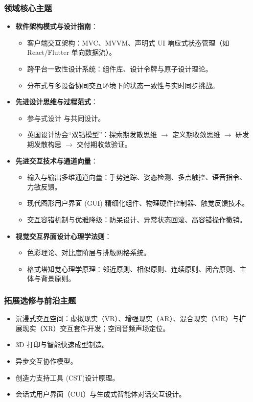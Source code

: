 \subsubsection{领域核心主题}
\begin{itemize}
    \item \textbf{软件架构模式与设计指南}：
    \begin{itemize}
        \item 客户端交互架构：MVC、MVVM、声明式 UI 响应式状态管理（如 React/Flutter 单向数据流）。
        \item 跨平台一致性设计系统：组件库、设计令牌与原子设计理论。
        \item 分布式与多设备协同交互环境下的状态一致性与实时同步挑战。
    \end{itemize}
    \item \textbf{先进设计思维与过程范式}：
    \begin{itemize}
        \item 参与式设计 与共同设计。
        \item 英国设计协会“双钻模型”：探索期发散思维 $\to$ 定义期收敛思维 $\to$ 研发期发散构思 $\to$ 交付期收敛验证。
    \end{itemize}
    \item \textbf{先进交互技术与通道向量}：
    \begin{itemize}
        \item 输入与输出多维通道向量：手势追踪、姿态检测、多点触控、语音指令、力敏反馈。
        \item 现代图形用户界面 (GUI) 精细化组件、物理硬件控制器、触觉反馈技术。
        \item 交互容错机制与优雅降级：防呆设计、异常状态回滚、高容错操作撤销。
    \end{itemize}
    \item \textbf{视觉交互界面设计心理学法则}：
    \begin{itemize}
        \item 色彩理论、对比度阶层与排版网格系统。
        \item 格式塔知觉心理学原理：邻近原则、相似原则、连续原则、闭合原则、主体与背景原则。
    \end{itemize}
\end{itemize}

\subsubsection{拓展选修与前沿主题}
\begin{itemize}
    \item 沉浸式交互空间：虚拟现实（VR）、增强现实（AR）、混合现实（MR）与扩展现实（XR）交互套件开发；空间音频声场定位。
    \item 3D 打印与智能快速成型制造。
    \item 异步交互协作模型。
    \item 创造力支持工具 (CST)设计原理。
    \item 会话式用户界面（CUI）与生成式智能体对话交互设计。
\end{itemize}


